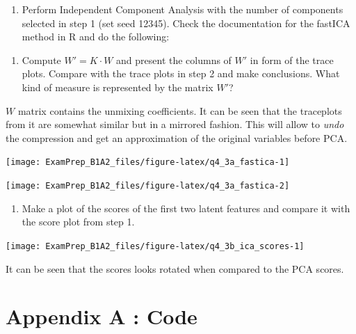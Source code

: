 \documentclass[
]{article}
\providecommand{\tightlist}{%
  \setlength{\itemsep}{0pt}\setlength{\parskip}{0pt}}
\begin{document}
\begin{enumerate}
\def\labelenumi{\arabic{enumi}.}
\setcounter{enumi}{2}
\tightlist
\item
  Perform Independent Component Analysis with the number of components
  selected in step 1 (set seed 12345). Check the documentation for the
  fastICA method in R and do the following:
\end{enumerate}

\begin{enumerate}
\def\labelenumi{\alph{enumi}.}
\tightlist
\item
  Compute \(W' = K \cdot W\) and present the columns of \(W'\) in form
  of the trace plots. Compare with the trace plots in step 2 and make
  conclusions. What kind of measure is represented by the matrix \(W'\)?
\end{enumerate}

\(W\) matrix contains the unmixing coefficients. It can be seen that the
traceplots from it are somewhat similar but in a mirrored fashion. This
will allow to \emph{undo} the compression and get an approximation of
the original variables before PCA.

\begin{center}\texttt{[image: ExamPrep\_B1A2\_files/figure-latex/q4\_3a\_fastica-1]} \end{center}

\begin{center}\texttt{[image: ExamPrep\_B1A2\_files/figure-latex/q4\_3a\_fastica-2]} \end{center}

\begin{enumerate}
\def\labelenumi{\alph{enumi}.}
\setcounter{enumi}{1}
\tightlist
\item
  Make a plot of the scores of the first two latent features and compare
  it with the score plot from step 1.
\end{enumerate}

\begin{center}\texttt{[image: ExamPrep\_B1A2\_files/figure-latex/q4\_3b\_ica\_scores-1]} \end{center}

It can be seen that the scores looks rotated when compared to the PCA
scores.

\newpage

\hypertarget{appendix-a-code}{%
\section{Appendix A : Code}\label{appendix-a-code}}
\end{document}
